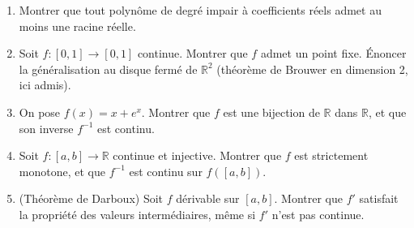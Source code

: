\begin{mdframed}[style=exobar]
  \begin{enumerate}
    \item Montrer que tout polynôme de degré impair à coefficients réels
          admet au moins une racine réelle.

    \item Soit $f : [0,1] \to [0,1]$ continue. Montrer que $f$ admet un
          point fixe. Énoncer la généralisation au disque fermé de
          $\mathbb{R}^2$ (théorème de Brouwer en dimension 2, ici admis).

    \item On pose $f(x) = x + e^x$. Montrer que $f$ est une bijection
          de $\mathbb{R}$ dans $\mathbb{R}$, et que son inverse $f^{-1}$
          est continu.

    \item Soit $f : [a,b] \to \mathbb{R}$ continue et injective. Montrer
          que $f$ est strictement monotone, et que $f^{-1}$ est continu
          sur $f([a,b])$.

    \item (Théorème de Darboux) Soit $f$ dérivable sur $[a,b]$. Montrer
          que $f'$ satisfait la propriété des valeurs intermédiaires,
          même si $f'$ n'est pas continue.
  \end{enumerate}
\end{mdframed}

